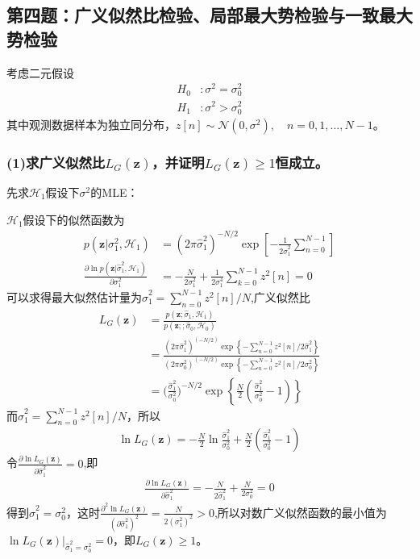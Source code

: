 \documentclass[fontset=windows]{article}
\numberwithin{figure}{section}
\begin{document}
\subsection{第四题：广义似然比检验、局部最大势检验与一致最大势检验}
考虑二元假设
\begin{align*}
	H_0 & :\sigma^2=\sigma^2_0 \\
	H_1 & :\sigma^2>\sigma^2_0
\end{align*}
其中观测数据样本为独立同分布，\(z[n]\sim \mathcal{N}(0,\sigma^2),\quad n=0,1,\ldots ,N-1。\)

\subsubsection*{(1)求广义似然比\(L_G(\mathbf{z})\)，并证明\(L_G(\mathbf{z})\geqslant1\)恒成立。}

先求\(\mathcal{H}_1\)假设下\(\sigma^2\)的MLE：

\(\mathcal{H}_1\)假设下的似然函数为
\begin{align*}
	p(\mathbf{z}|\sigma^2_1,\mathcal{H}_1)
	 & =(2\pi \hat{\sigma}^2_1)^{-N/2}
	\exp\left[-\frac{1}{2\hat{\sigma}^2_1}\sum_{n=0}^{N-1}\right]            \\
	\frac{\partial \ln p(\mathbf{z}|\hat{\sigma}^2_1,\mathcal{H}_1)}{\partial \sigma^2_1}
	 & =-\frac{N}{2\sigma^2_1}+\frac{1}{2\sigma^4_1}\sum_{k=0}^{N-1}z^2[n]=0
\end{align*}
可以求得最大似然估计量为\(\hat{\sigma}_1^2=\sum_{n=0}^{N-1}z^2[n]/N\),广义似然比
\begin{align*}
	L_G(\mathbf{z})
	 & =\frac{p(\mathbf{z};\hat{\sigma}_1,\mathcal{H}_1)}
	{p(\mathbf{z};;\hat{\sigma}_0,\mathcal{H}_0)}                                                             \\
	 & =\frac{(2\pi \hat{\sigma}_1^2)^{(-N/2)}\exp \left\{ -\sum_{n=0}^{N-1}z^2[n]/2\hat{\sigma}_1^2\right\}}
	{(2\pi \sigma_0^2)^{(-N/2)}\exp \left\{ -\sum_{n=0}^{N-1}z^2[n]/2\sigma^2_0\right\}}                      \\
	 & =\bigg(\frac{\hat{\sigma}_1^2}{\sigma_0^2}\bigg)^{-N/2}
	\exp\left\{\frac{N}{2}(\frac{\hat{\sigma}_1^2}{\sigma_0^2}-1) \right\}
\end{align*}
而\(\hat{\sigma}_1^2=\sum_{n=0}^{N-1}z^2[n]/N\)，所以
\begin{align*}
	\ln L_G(\mathbf{z})=-\frac{N}{2}\ln\frac{\hat{\sigma}_1^2}{\sigma_0^2}+\frac{N}{2}(\frac{\hat{\sigma}_1^2}{\sigma_0^2}-1)
\end{align*}
令\(\frac{\partial \ln L_G(\mathbf{z})}{\partial \hat{\sigma}_1^2}=0\),即
\begin{align*}
	\frac{\partial \ln L_G(\mathbf{z})}{\partial \hat{\sigma}_1^2}=
	-\frac{N}{2\hat{\sigma}_1^2}+\frac{N}{2\sigma_0^2}=0
\end{align*}
得到\(\hat{\sigma}_1^2=\sigma_0^2\)，这时\(\frac{\partial^2 \ln L_G(\mathbf{z})}{(\partial \hat{\sigma}_1^2)^2}=\frac{N}{2(\sigma^2_1)^2}>0\),所以对数广义似然函数的最小值为\(\ln L_G(\mathbf{z})|_{\hat{\sigma}_1^2=\sigma_0^2}=0\)，即\(L_G(\mathbf{z})\geqslant1\)。
\end{document}
